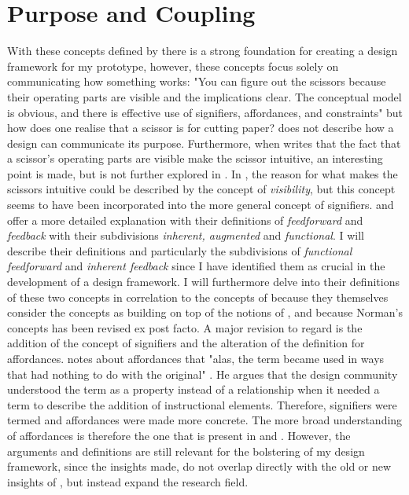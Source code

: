 \section{Purpose and Coupling}
With these concepts defined by  there is a strong foundation for creating a design framework for my prototype, however, these concepts focus solely on communicating how something works: "You can figure out the scissors because their operating parts are visible and the implications clear. The conceptual model is obvious, and there is effective use of signifiers, affordances, and constraints" \cite[p. 27]{norman} but how does one realise that a scissor is for cutting paper?  does not describe how a design can communicate its purpose. Furthermore, when  writes that the fact that a scissor's operating parts are visible make the scissor intuitive, an interesting point is made, but is not further explored in . In , the reason for what makes the scissors intuitive could be described by the concept of \textit{visibility}, but this concept seems to have been incorporated into the more general concept of signifiers.  and  offer a more detailed explanation with their definitions of \textit{feedforward} and \textit{feedback} with their subdivisions \textit{inherent, augmented} and \textit{functional}. I will describe their definitions and particularly the subdivisions of \textit{functional feedforward} and \textit{inherent feedback} since I have identified them as crucial in the development of a design framework. I will furthermore delve into their definitions of these two concepts in correlation to the concepts of  because they themselves consider the concepts as building on top of the notions of , and because Norman's concepts has been revised \cite{norman} ex post facto. A major revision to regard is the addition of the concept of signifiers and the alteration of the definition for affordances.  notes about affordances that "alas, the term became used in ways that had nothing to do with the original" \cite[p. 13]{norman}. He argues that the design community understood the term as a property instead of a relationship when it needed a term to describe the addition of instructional elements. Therefore, signifiers were termed and affordances were made more concrete. The more broad understanding of affordances is therefore the one that is present in  and . However, the arguments and definitions are still relevant for the bolstering of my design framework, since the insights made, do not overlap directly with the old or new insights of , but instead expand the research field.

